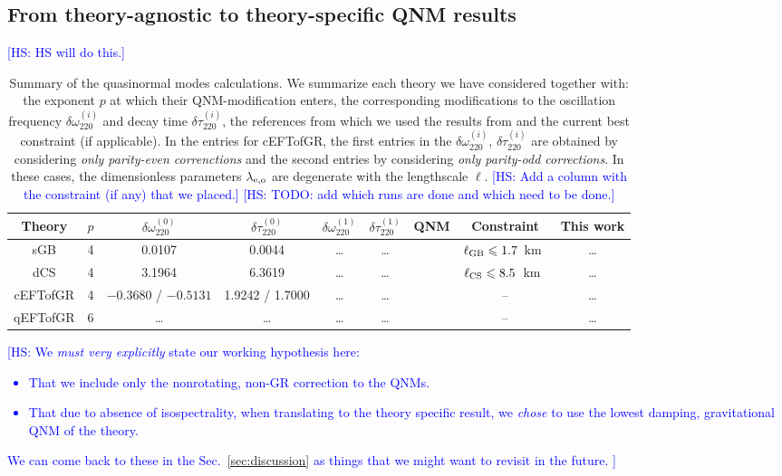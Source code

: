 \documentclass[twocolumn,prd,aps,superscriptaddress,preprintnumbers,tightenlines,showpacs,nofootinbib,eqsecnum,amsfonts,amsmath,longbibliography]{revtex4-1}
\newcommand{\hs}[1]{{\textcolor{blue}{{[HS: #1]}} }}
\begin{document}

\subsection{From theory-agnostic to theory-specific QNM results}

\hs{HS will do this.}

\begin{table}[th]
\begin{tabular}{c | c c c c c c c c}
\hline
\hline
Theory & $p$ & $\delta \omega^{(0)}_{220}$ & $\delta \tau^{(0)}_{220}$ & $\delta \omega^{(1)}_{220}$ & $\delta \tau^{(1)}_{220}$ & QNM & Constraint & This work \\
\hline
sGB      & 4 & 0.0107 & 0.0044 & \dots & \dots &  \cite{Pierini:2021jxd} & $\ell_{\rm GB} \leqslant 1.7$~km~\cite{Perkins:2021mhb} & \dots \\
dCS      & 4 & 3.1964 & 6.3619 & \dots & \dots &  \cite{Wagle:2021tam}   & $\ell_{\rm CS} \leqslant 8.5$~km~\cite{Silva:2020acr}   & \dots \\
cEFTofGR & 4 & $-0.3680$ / $-0.5131$  & 1.9242 / 1.7000 & \dots & \dots & \cite{Cano:2021myl} & --  & \dots \\
qEFTofGR & 6 & \dots & \dots & \dots & \dots & \cite{Cano:2021myl} & --  & \dots \\
\hline
\hline
\end{tabular}
\caption{Summary of the quasinormal modes calculations.
%
We summarize each theory we have considered together with: the exponent $p$ at
which their QNM-modification enters, the corresponding modifications to the
oscillation frequency $\delta \omega^{(i)}_{220}$ and decay time $\delta \tau^{(i)}_{220}$, the
references from which we used the results from and the current best constraint
(if applicable).
%
In the entries for cEFTofGR, the first entries in the $\delta
\omega^{(i)}_{220}$, $\delta \tau^{(i)}_{220}$ are obtained by considering
\emph{only parity-even correnctions} and the second entries by considering
\emph{only parity-odd corrections}. In these cases, the dimensionless parameters
$\lambda_{\rm e,o}$ are degenerate with the lengthscale $\ell$.
%
\hs{Add a column with the constraint (if any) that we placed.}
\hs{TODO: add which runs are done and which need to be done.}
}
\label{tab:ref_theories_qnms}
\end{table}

\hs{We {\it must very explicitly} state our working hypothesis here:
%
\begin{itemize}
    \item That we include only the nonrotating, non-GR correction to the QNMs.
    \item That due to absence of isospectrality, when translating to the theory specific result,
    we {\it chose} to use the lowest damping, gravitational QNM of the theory.
\end{itemize}
%
We can come back to these in the Sec.~\ref{sec:discussion} as things that we
might want to revisit in the future.
}
\end{document}
